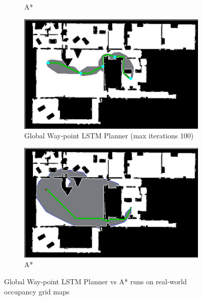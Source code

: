 \begin{figure}[]
\begin{subfigure}[b]{0.48\linewidth}
     \caption{A*\newline}
  \end{subfigure}
  \hfill
  \begin{subfigure}[b]{0.48\linewidth}
    \includegraphics[width=\linewidth]{images/screenshot_140.png}
     \caption{Global Way-point LSTM Planner (max iterations 100)}
  \end{subfigure}
  \hfill
  \begin{subfigure}[b]{0.48\linewidth}
    \includegraphics[width=\linewidth]{images/screenshot_114.png}
     \caption{A*\newline}
  \end{subfigure}
  \caption{Global Way-point LSTM Planner vs A* runs on real-world occupancy grid maps \cite{first_map}}
  \label{fig: wp_vs_a_1}
\end{figure}

